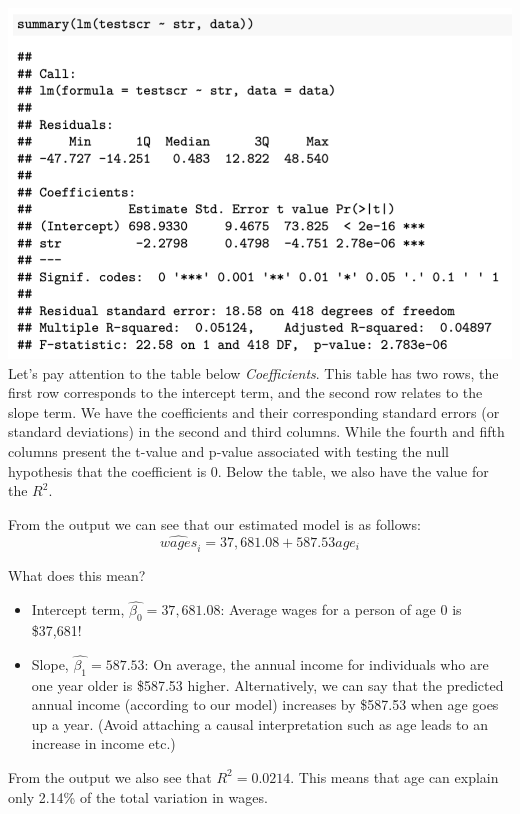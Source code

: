 \documentclass{./../handout}
\begin{document}
\includegraphics[scale=0.45]{reg_output.png} \\

Let's pay attention to the table below \textit{Coefficients}. This table has two rows, the first row corresponds to the intercept term, and the second row relates to the slope term. We have the coefficients and their corresponding standard errors (or standard deviations) in the second and third columns. While the fourth and fifth columns present the t-value and p-value associated with testing the null hypothesis that the coefficient is 0. Below the table, we also have the value for the $R^2$.   

\newpage

From the output we can see that our estimated model is as follows:
  $$ \hat{wages}_i = 37,681.08 + 587.53 age_i   $$
  
 What does this mean?
 \begin{itemize}
  \item Intercept term, $\hat{\beta_0}=37,681.08$: Average wages for a person of age 0 is \$37,681!
 \item Slope, $\hat{\beta_1}=587.53$: On average, the annual income for individuals who are one year older is \$587.53 higher. Alternatively, we can say that the predicted annual income (according to our model) increases by \$587.53 when age goes up a year. (Avoid attaching a causal interpretation such as age leads to an increase in income etc.)
\end{itemize}

From the output we also see that $R^2 = 0.0214$. This means that age can explain only 2.14\% of the total variation in wages. \\
\end{document}
